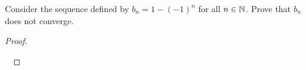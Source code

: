 \documentclass[11pt,openany]{article}
\begin{document}
\newpage
\begin{example*}
	Consider the sequence defined by $b_n=1-(-1)^n$ for all $n\in\mathbb{N}$. Prove that $b_n$ does not converge. 
	\begin{center}
		
	\end{center}
	\begin{proof}
		\ 
		\begin{center}
			
		\end{center}
\ \vfill
	\end{proof}
\end{example*}
\end{document}
